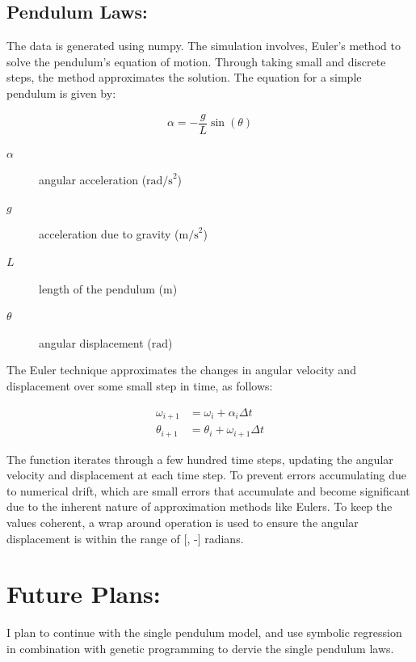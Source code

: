 \documentclass{article}
\begin{document}


\subsection{Pendulum Laws:}

The data is generated using numpy. The simulation involves, Euler's method to solve the pendulum's equation of motion. Through taking small and discrete steps, the method approximates the solution. The equation for a simple pendulum is given by: \\

\begin{center}
\begin{equation}
\alpha = -\frac{g}{L} \sin(\theta)
\end{equation}
\end{center}

\begin{description}
    \item[\(\alpha\)] angular acceleration (\(\text{rad/s}^2\))
    \item[\(g\)] acceleration due to gravity (\(\text{m/s}^2\))
    \item[\(L\)] length of the pendulum (\(\text{m}\))
    \item[\(\theta\)] angular displacement (\(\text{rad}\))
\end{description}

The Euler technique approximates the changes in angular velocity and displacement over some small step in time, as follows:\\

\begin{center}
\begin{align} 
\omega_{i+1} &= \omega_i + \alpha_i \Delta t \\
\theta_{i+1} &= \theta_i + \omega_{i+1} \Delta t 
\end{align}
\end{center}


The function iterates through a few hundred time steps, updating the angular velocity and displacement at each time step. To prevent errors accumulating due to numerical drift, which are small errors that accumulate and become significant due to the inherent nature of approximation methods like Eulers. To keep the values coherent, a wrap around operation is used to ensure the angular displacement is within the range of [\pi, -\pi] radians.\\ 

\section{Future Plans: }

I plan to continue with the single pendulum model, and use symbolic regression in combination with genetic programming to dervie the single pendulum laws. \\ 

 
\end{document}
